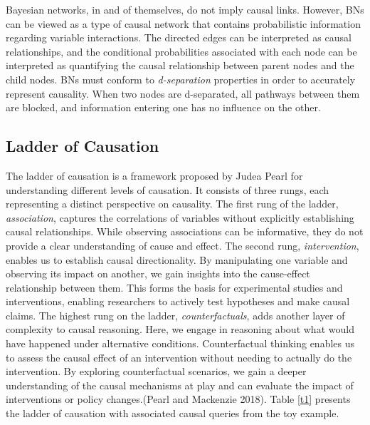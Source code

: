 \documentclass[twocol]{ametsoc}
\begin{document}
Bayesian networks, in and of themselves, do not imply causal links.
However, BNs can be viewed as a type of causal network that contains
probabilistic information regarding variable interactions. The directed
edges can be interpreted as causal relationships, and the conditional
probabilities associated with each node can be interpreted as
quantifying the causal relationship between parent nodes and the child
nodes. BNs must conform to \emph{d-separation} properties in order to
accurately represent causality. When two nodes are d-separated, all
pathways between them are blocked, and information entering one has no
influence on the other.

\hypertarget{ladder-of-causation}{%
\subsection{Ladder of Causation}\label{ladder-of-causation}}

The ladder of causation is a framework proposed by Judea Pearl for
understanding different levels of causation. It consists of three rungs,
each representing a distinct perspective on causality. The first rung of
the ladder, \emph{association}, captures the correlations of variables
without explicitly establishing causal relationships. While observing
associations can be informative, they do not provide a clear
understanding of cause and effect. The second rung, \emph{intervention},
enables us to establish causal directionality. By manipulating one
variable and observing its impact on another, we gain insights into the
cause-effect relationship between them. This forms the basis for
experimental studies and interventions, enabling researchers to actively
test hypotheses and make causal claims. The highest rung on the ladder,
\emph{counterfactuals}, adds another layer of complexity to causal
reasoning. Here, we engage in reasoning about what would have happened
under alternative conditions. Counterfactual thinking enables us to
assess the causal effect of an intervention without needing to actually
do the intervention. By exploring counterfactual scenarios, we gain a
deeper understanding of the causal mechanisms at play and can evaluate
the impact of interventions or policy changes.(Pearl and Mackenzie
2018). Table \ref{t1} presents the ladder of causation with associated
causal queries from the toy example.

\begin{table}[h]
\caption{Ladder of Causation}\label{t1}
\begin{center}
\end{center}
\end{table}
\end{document}
